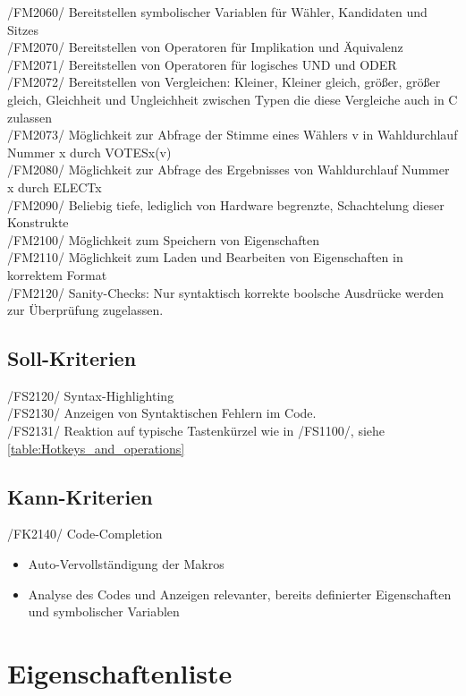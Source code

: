 \documentclass[a4paper]{scrreprt}
\begin{document}
/FM2060/ Bereitstellen symbolischer Variablen für Wähler, Kandidaten und Sitzes \\
/FM2070/ Bereitstellen von Operatoren für Implikation und Äquivalenz \\
/FM2071/ Bereitstellen von Operatoren für logisches UND und ODER \\
/FM2072/ Bereitstellen von Vergleichen: Kleiner, Kleiner gleich, größer, größer gleich,  Gleichheit und Ungleichheit zwischen Typen die diese Vergleiche auch in C zulassen \\
/FM2073/ Möglichkeit zur Abfrage der Stimme eines Wählers v in Wahldurchlauf Nummer x durch VOTESx(v)\\
/FM2080/ Möglichkeit zur Abfrage des Ergebnisses von Wahldurchlauf Nummer x durch ELECTx \\
/FM2090/ Beliebig tiefe, lediglich von Hardware begrenzte, Schachtelung dieser Konstrukte \\
/FM2100/ Möglichkeit zum Speichern von Eigenschaften \\
/FM2110/ Möglichkeit zum Laden und Bearbeiten von Eigenschaften in korrektem Format \\
/FM2120/ Sanity-Checks: Nur syntaktisch korrekte boolsche Ausdrücke werden zur Überprüfung zugelassen.

\subsection{Soll-Kriterien}
/FS2120/ Syntax-Highlighting \\
/FS2130/ Anzeigen von Syntaktischen Fehlern im Code. \\
/FS2131/ Reaktion auf typische Tastenkürzel wie in /FS1100/, siehe \ref{table:Hotkeys_and_operations} \\


\subsection{Kann-Kriterien}
/FK2140/ Code-Completion
\begin{itemize}
\item Auto-Vervollständigung der Makros
\item Analyse des Codes und Anzeigen relevanter, bereits definierter Eigenschaften und symbolischer Variablen
\end{itemize}

\section{Eigenschaftenliste}
\end{document}
